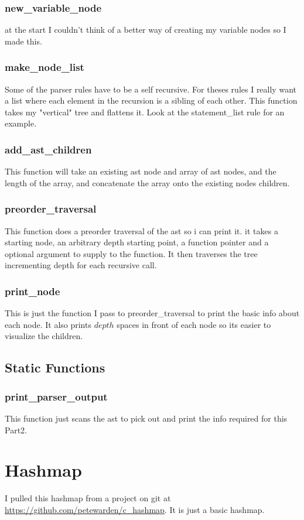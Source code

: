 \documentclass[11pt]{article}
\begin{document}
            \subsubsection{new\_variable\_node}
                at the start I couldn't think of a better way of creating my variable nodes so I made this.

            \subsubsection{make\_node\_list}
                Some of the parser rules have to be a self recursive. For theses
                rules I really want a list where each element in the recursion is a sibling
                of each other. This function takes my "vertical" tree and flattens it. 
                Look at the  statement\_list rule for an example.

            \subsubsection{add\_ast\_children}
                This function will take an existing ast node and array of ast nodes, and the
                length of the array, and concatenate the array onto the existing nodes children.

            \subsubsection{preorder\_traversal}
                This function does a preorder traversal of the ast so i can print it. it takes a starting node,
                an arbitrary depth starting point, a function pointer and a optional argument to supply to the
                function. It then traverses the tree incrementing depth for each recursive call.

            \subsubsection{print\_node}
                This is just the function I pass to preorder\_traversal to print the basic info about each node.
                It also prints $depth$ spaces in front of each node so its easier to visualize the children.

        \subsection{Static Functions}

            \subsubsection{print\_parser\_output}
                This function just scans the ast to pick out and print the info required for this Part2.

    \section{Hashmap}
        I pulled this hashmap from a project on git at \url{https://github.com/petewarden/c\_hashmap}.
        It is just a basic hashmap.
\end{document}
